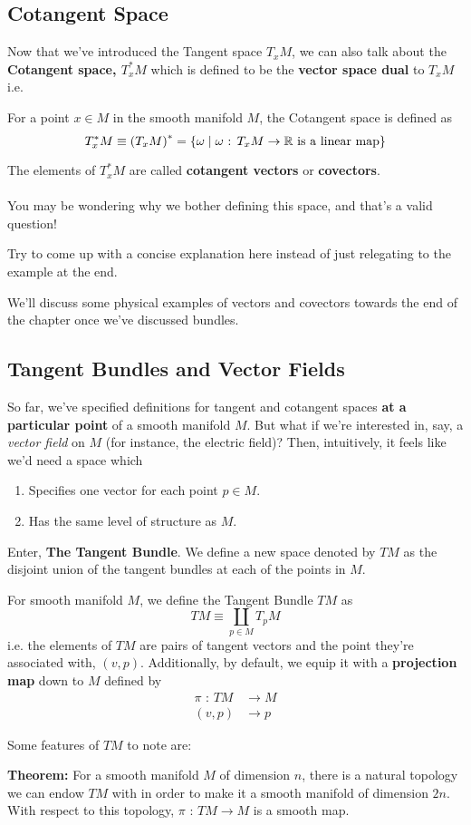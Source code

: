 \documentclass[11pt]{article}
\begin{document}
\subsection{Cotangent Space}
Now that we've introduced the Tangent space $T_{x} M$, we can also talk about the \textbf{Cotangent space, $T_x^{*}M$} which is defined to be the \textbf{vector space dual} to $T_{x} M$ i.e.
\begin{redbox}
  For a point $x \in M$ in the smooth manifold $M$, the Cotangent space is defined as 
  \[ T_{x}^{*}M \equiv \left(T_x M\right)^{*} = \left\{ \omega \;\vert\; \omega \text{ : } T_{x} M \rightarrow \mathbb{R} \text{ is a linear map} \right\} \]
\end{redbox}
The elements of $T_x^*M$ are called \textbf{cotangent vectors} or \textbf{covectors}.
\\
\\
You may be wondering why we bother defining this space, and that's a valid question! \begin{note}
  {Try to come up with a concise explanation here instead of just relegating to the example at the end.}
\end{note} We'll discuss some physical examples of vectors and covectors towards the end of the chapter once we've discussed bundles.
\\
\subsection{Tangent Bundles and Vector Fields}
So far, we've specified definitions for tangent and cotangent spaces \textbf{at a particular point} of a smooth manifold $M$. But what if we're interested in, say, a \textit{vector field} on $M$ (for instance, the electric field)? Then, intuitively, it feels like we'd need a space which
\begin{enumerate}
  \item Specifies one vector for each point $p \in M$.
  \item Has the same level of structure as $M$.
\end{enumerate}
Enter, \textbf{The Tangent Bundle}. We define a new space denoted by $TM$ as the disjoint union of the tangent bundles at each of the points in $M$.
\begin{redbox}
  For smooth manifold $M$, we define the Tangent Bundle $TM$ as 
  \[ TM \equiv \coprod_{p \in M} T_p M \]
  i.e. the elements of $TM$ are pairs of tangent vectors and the point they're associated with, $(v, p)$. Additionally, by default, we equip it with a \textbf{projection map} down to $M$ defined by
  \begin{align*}
    \pi \text{ : } TM &\rightarrow M \\
          (v, p) &\rightarrow p
  \end{align*}
\end{redbox}
\vskip 0.5cm
Some features of $TM$ to note are:
\begin{bluebox}
  \textbf{Theorem:} For a smooth manifold $M$ of dimension $n$, there is a natural topology we can endow $TM$ with in order to make it a smooth manifold of dimension $2n$. With respect to this topology, $\pi \text{ : } TM \rightarrow M$ is a smooth map.
\end{bluebox}
\end{document}
